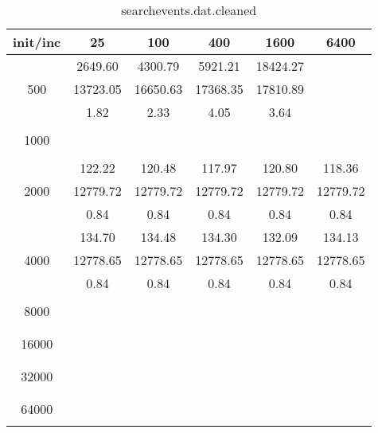 \begin{table}[th]
\caption{searchevents.dat.cleaned}
\label{tab:searchevents.dat.cleaned}
\centering
\begin{tabular}{|c||c|c|c|c|c|}
\hline
init/inc & 25 & 100 & 400 & 1600 & 6400 \\ \hline \hline
  & 2649.60 & 4300.79 & 5921.21 & 18424.27 & \\ 
500  & 13723.05 & 16650.63 & 17368.35 & 17810.89 & \\ 
  & 1.82 & 2.33 & 4.05 & 3.64 & \\ \hline 
  &  &  &  &  & \\ 
1000  &  &  &  &  & \\ 
  &  &  &  &  & \\ \hline 
  & 122.22 & 120.48 & 117.97 & 120.80 & 118.36\\ 
2000  & 12779.72 & 12779.72 & 12779.72 & 12779.72 & 12779.72\\ 
  & 0.84 & 0.84 & 0.84 & 0.84 & 0.84\\ \hline 
  & 134.70 & 134.48 & 134.30 & 132.09 & 134.13\\ 
4000  & 12778.65 & 12778.65 & 12778.65 & 12778.65 & 12778.65\\ 
  & 0.84 & 0.84 & 0.84 & 0.84 & 0.84\\ \hline 
  &  &  &  &  & \\ 
8000  &  &  &  &  & \\ 
  &  &  &  &  & \\ \hline 
  &  &  &  &  & \\ 
16000  &  &  &  &  & \\ 
  &  &  &  &  & \\ \hline 
  &  &  &  &  & \\ 
32000  &  &  &  &  & \\ 
  &  &  &  &  & \\ \hline 
  &  &  &  &  & \\ 
64000  &  &  &  &  & \\ 
  &  &  &  &  & \\ \hline 
\end{tabular}
\end{table}

